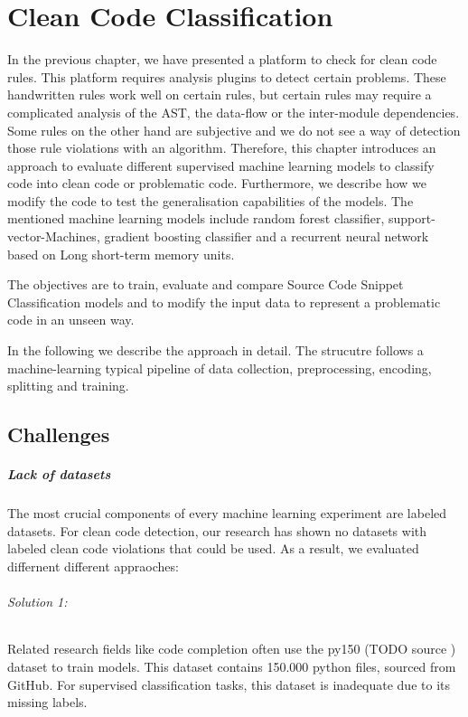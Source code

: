 \chapter{Clean Code Classification}
In the previous chapter, we have presented a platform to check for clean code rules. This platform requires analysis plugins to detect certain problems. These handwritten rules work well on certain rules, but certain rules may require a complicated analysis of the AST, the data-flow or the inter-module dependencies. Some rules on the other hand are subjective and we do not see a way of detection those rule violations with an algorithm.
Therefore, this chapter introduces an approach to evaluate different supervised machine learning models to classify code into clean code or problematic code. Furthermore, we describe how we modify the code to test the generalisation capabilities of the models. The mentioned machine learning models include random forest classifier, support-vector-Machines, gradient boosting classifier and a recurrent neural network based on Long short-term memory units. 

The objectives are to train, evaluate and compare Source Code Snippet Classification models and to modify the input data to represent a problematic code in an unseen way.

In the following we describe the approach in detail. The strucutre follows a machine-learning typical pipeline of data collection, preprocessing, encoding, splitting and training. 

\section{Challenges}
\paragraph{Lack of datasets}
The most crucial components of every machine learning experiment are labeled datasets. For clean code detection, our research has shown no datasets with labeled clean code violations that could be used.
As a result, we evaluated differnent different appraoches:

\subparagraph{Solution 1:}
Related research fields like code completion often use the py150 (TODO source ) dataset to train models. This dataset contains 150.000 python files, sourced from GitHub. For supervised classification tasks, this dataset is inadequate due to its missing labels.  

